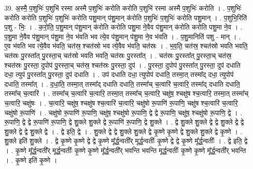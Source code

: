 \documentclass[17pt]{extarticle}
\begin{document}
39. अ॒स्मै॒ प॒शुभिः॑ प॒शुभि॑ रस्मा अस्मै प॒शुभिः॑ करोति करोति प॒शुभि॑ रस्मा अस्मै प॒शुभिः॑ करोति । . प॒शुभिः॑ करोति करोति प॒शुभिः॑ प॒शुभिः॑ करोति पशु॒मान् प॑शु॒मान् क॑रोति प॒शुभिः॑ प॒शुभिः॑ करोति पशु॒मान् । . प॒शुभि॒रिति॑ प॒शु - भिः॒ । . क॒रो॒ति॒ प॒शु॒मान् प॑शु॒मान् क॑रोति करोति पशु॒मा ने॒वैव प॑शु॒मान् क॑रोति करोति पशु॒मा ने॒व । . प॒शु॒मा ने॒वैव प॑शु॒मान् प॑शु॒मा ने॒व भ॑वति भव त्ये॒व प॑शु॒मान् प॑शु॒मा ने॒व भ॑वति । . प॒शु॒मानिति॑ पशु - मान् । . ए॒व भ॑वति भव त्ये॒वैव भ॑वति॒ चत॑स्र॒ श्चत॑स्रो भव त्ये॒वैव भ॑वति॒ चत॑स्रः । . भ॒व॒ति॒ चत॑स्र॒ श्चत॑स्रो भवति भवति॒ चत॑स्रः पु॒रस्ता᳚त् पु॒रस्ता॒च् चत॑स्रो भवति भवति॒ चत॑स्रः पु॒रस्ता᳚त् । . चत॑स्रः पु॒रस्ता᳚त् पु॒रस्ता॒च् चत॑स्र॒ श्चत॑स्रः पु॒रस्ता॒ दुपोप॑ पु॒रस्ता॒च् चत॑स्र॒ श्चत॑स्रः पु॒रस्ता॒ दुप॑ । . पु॒रस्ता॒ दुपोप॑ पु॒रस्ता᳚त् पु॒रस्ता॒ दुप॑ दधाति दधा॒ त्युप॑ पु॒रस्ता᳚त् पु॒रस्ता॒ दुप॑ दधाति । . उप॑ दधाति दधा॒ त्युपोप॑ दधाति॒ तस्मा॒त् तस्मा᳚द् दधा॒ त्युपोप॑ दधाति॒ तस्मा᳚त् । . द॒धा॒ति॒ तस्मा॒त् तस्मा᳚द् दधाति दधाति॒ तस्मा᳚च् च॒त्वारि॑ च॒त्वारि॒ तस्मा᳚द् दधाति दधाति॒ तस्मा᳚च् च॒त्वारि॑ । . तस्मा᳚च् च॒त्वारि॑ च॒त्वारि॒ तस्मा॒त् तस्मा᳚च् च॒त्वारि॒ चक्षु॑ष॒ श्चक्षु॑ष श्च॒त्वारि॒ तस्मा॒त् तस्मा᳚च् च॒त्वारि॒ चक्षु॑षः । . च॒त्वारि॒ चक्षु॑ष॒ श्चक्षु॑ष श्च॒त्वारि॑ च॒त्वारि॒ चक्षु॑षो रू॒पाणि॑ रू॒पाणि॒ चक्षु॑ष श्च॒त्वारि॑ च॒त्वारि॒ चक्षु॑षो रू॒पाणि॑ । . चक्षु॑षो रू॒पाणि॑ रू॒पाणि॒ चक्षु॑ष॒ श्चक्षु॑षो रू॒पाणि॒ द्वे द्वे रू॒पाणि॒ चक्षु॑ष॒ श्चक्षु॑षो रू॒पाणि॒ द्वे । . रू॒पाणि॒ द्वे द्वे रू॒पाणि॑ रू॒पाणि॒ द्वे शु॒क्ले शु॒क्ले द्वे रू॒पाणि॑ रू॒पाणि॒ द्वे शु॒क्ले । . द्वे शु॒क्ले शु॒क्ले द्वे द्वे शु॒क्ले द्वे द्वे शु॒क्ले द्वे द्वे शु॒क्ले द्वे । . द्वे इति॒ द्वे । . शु॒क्ले द्वे द्वे शु॒क्ले शु॒क्ले द्वे कृ॒ष्णे कृ॒ष्णे द्वे शु॒क्ले शु॒क्ले द्वे कृ॒ष्णे । . शु॒क्ले इति॑ शु॒क्ले । . द्वे कृ॒ष्णे कृ॒ष्णे द्वे द्वे कृ॒ष्णे मू᳚र्द्ध॒न्वती᳚र् मूर्द्ध॒न्वतीः᳚ कृ॒ष्णे द्वे द्वे कृ॒ष्णे मू᳚र्द्ध॒न्वतीः᳚ । . द्वे इति॒ द्वे । . कृ॒ष्णे मू᳚र्द्ध॒न्वती᳚र् मूर्द्ध॒न्वतीः᳚ कृ॒ष्णे कृ॒ष्णे मू᳚र्द्ध॒न्वती᳚र् भवन्ति भवन्ति मूर्द्ध॒न्वतीः᳚ कृ॒ष्णे कृ॒ष्णे मू᳚र्द्ध॒न्वती᳚र् भवन्ति । . कृ॒ष्णे इति॑ कृ॒ष्णे । \newline
\pagebreak
{}
\end{document}
